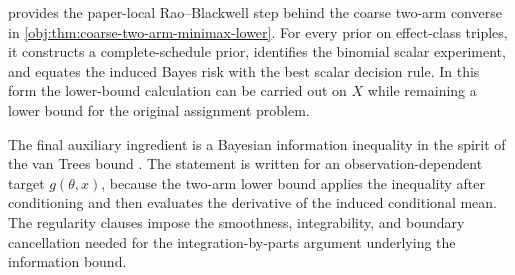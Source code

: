  provides the paper-local Rao--Blackwell step behind the coarse two-arm converse in \cref{obj:thm:coarse-two-arm-minimax-lower}. For every prior on effect-class triples, it constructs a complete-schedule prior, identifies the binomial scalar experiment, and equates the induced Bayes risk with the best scalar decision rule. In this form the lower-bound calculation can be carried out on \(X\) while remaining a lower bound for the original assignment problem.

The final auxiliary ingredient is a Bayesian information inequality in the spirit of the van Trees bound \citep{van_trees_1968,gill_1995}. The statement is written for an observation-dependent target \(g(\theta,x)\), because the two-arm lower bound applies the inequality after conditioning and then evaluates the derivative of the induced conditional mean. The regularity clauses impose the smoothness, integrability, and boundary cancellation needed for the integration-by-parts argument underlying the information bound.

